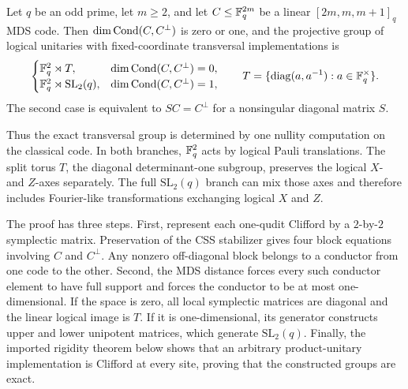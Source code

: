 \begin{theorem}
\label{thm:diagonal-isodual-transversal-group}
Let \(q\) be an odd prime, let \(m\geq2\), and let
\(C\leq\mathbb F_q^{2m}\) be a linear \([2m,m,m+1]_q\) MDS code.  Then
\(\dim\operatorname{Cond}(C,C^\perp)\) is zero or one, and the projective group of
logical unitaries with fixed-coordinate transversal implementations is
\[
\begin{cases}
 \mathbb F_q^2\rtimes T,
   &\dim\operatorname{Cond}(C,C^\perp)=0,\\
 \mathbb F_q^2\rtimes\mathrm{SL}_2(q),
   &\dim\operatorname{Cond}(C,C^\perp)=1,
\end{cases}
\qquad
T=\{\operatorname{diag}(a,a^{-1}):a\in\mathbb F_q^\times\}.
\]
The second case is equivalent to \(SC=C^\perp\) for a nonsingular diagonal
matrix \(S\).
\end{theorem}

Thus the exact transversal group is determined by one nullity computation on
the classical code.  In both branches, \(\mathbb F_q^2\) acts by logical Pauli
translations.  The split torus \(T\), the diagonal determinant-one subgroup,
preserves the logical \(X\)- and \(Z\)-axes separately.  The full
\(\mathrm{SL}_2(q)\) branch can mix those axes and therefore includes
Fourier-like transformations exchanging logical \(X\) and \(Z\).

The proof has three steps.  First, represent each one-qudit Clifford by a
\(2\)-by-\(2\) symplectic matrix.  Preservation of the CSS stabilizer gives
four block equations involving \(C\) and \(C^\perp\).  Any nonzero
off-diagonal block belongs to a conductor from one code to the other.
Second, the MDS distance forces every such conductor element to have full
support and forces the conductor to be at most one-dimensional.  If the space is
zero, all local symplectic matrices are diagonal and the linear logical image
is \(T\).  If it is one-dimensional, its generator constructs upper and lower
unipotent matrices, which generate \(\mathrm{SL}_2(q)\).  Finally, the
imported rigidity theorem below shows that an arbitrary product-unitary
implementation is Clifford at every site, proving that the constructed groups
are exact.

